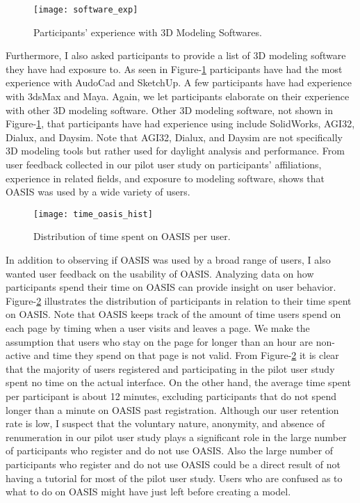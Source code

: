 \begin{figure}[!ht]
	\centering
	\caption{Participants' experience with 3D Modeling Softwares.}
	\label{fig:software_exp}
	\texttt{[image: software\_exp]}
\end{figure}

Furthermore, I also asked participants to provide a list of 3D modeling software they have had exposure to.
As seen in Figure-\ref{fig:software_exp} participants have had the most experience with AudoCad\cite{todo} and SketchUp\cite{todo}. 
A few participants have had experience with 3dsMax\cite{todo} and Maya\cite{todo}.
Again, we let participants elaborate on their experience with other 3D modeling software. 
Other 3D modeling software, not shown in Figure-\ref{fig:software_exp}, that participants have had experience using include SolidWorks\cite{todo}, AGI32\cite{todo}, Dialux\cite{todo}, and Daysim\cite{todo}.
Note that AGI32, Dialux, and Daysim are not specifically 3D modeling tools but rather used for daylight analysis and performance.
From user feedback collected in our pilot user study on participants' affiliations, experience in related fields, and exposure to modeling software, shows that OASIS was used by a wide variety of users.

\begin{figure}[!ht]
	\centering
	\caption{Distribution of time spent on OASIS per user.}
	\label{fig:time_oasis_hist}
	\texttt{[image: time\_oasis\_hist]}
\end{figure}

In addition to observing if OASIS was used by a broad range of users, I also wanted user feedback on the usability of OASIS.
Analyzing data on how participants spend their time  on OASIS can provide insight on user behavior.
Figure-\ref{fig:time_oasis_hist} illustrates the distribution of participants in relation to their time spent on OASIS.
Note that OASIS keeps track of the amount of time users spend on each page by timing when a user visits and leaves a page. We make the assumption that users who stay on the page for longer than an hour are non-active and time they spend on that page is not valid.
From Figure-\ref{fig:time_oasis_hist} it is clear that the majority of users registered and participating in the pilot user study spent no time on the actual interface.
On the other hand, the average time spent per participant is about 12 minutes, excluding participants that do not spend longer than a minute on OASIS past registration.
Although our user retention rate is low, I suspect that the voluntary nature, anonymity, and absence of renumeration in our pilot user study plays a significant role in the large number of participants who register and do not use OASIS.
Also  the large number of participants who register and do not use OASIS  could be a direct result of not having a tutorial for most of the pilot user study.
Users who are confused as to what to do on OASIS might have just left before creating a model.

